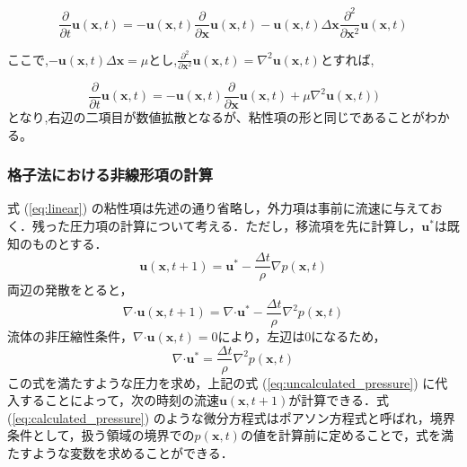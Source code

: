 \documentclass[a4j,12pt]{jreport}
\begin{document}
$$ \frac{\partial}{\partial t}\bm{u} (\bm{x},t)  =  -\bm{u} (\bm{x},t) \frac{\partial}{\partial \bm{x}}\bm{u} (\bm{x},t)  -\bm{u} (\bm{x},t) \varDelta \bm{x}\frac{\partial^2}{\partial \bm{x}^2}\bm{u} (\bm{x},t) $$

ここで,$ -\bm{u} (\bm{x},t) \varDelta \bm{x} = \mu$とし,$\frac{\partial^2}{\partial \bm{x}^2}\bm{u} (\bm{x},t)  = \nabla^2\bm{u} (\bm{x},t) $とすれば,

$$ \frac{\partial}{\partial t}\bm{u} (\bm{x},t)  =  -\bm{u} (\bm{x},t) \frac{\partial}{\partial \bm{x}}\bm{u} (\bm{x},t)  +\mu\nabla^2\bm{u} (\bm{x},t) ) $$
となり,右辺の二項目が数値拡散となるが、粘性項の形と同じであることがわかる。
\subsubsection{格子法における非線形項の計算} \label{subsec:gridpressure}
式 (\ref{eq:linear}) の粘性項は先述の通り省略し，外力項は事前に流速に与えておく．残った圧力項の計算について考える．ただし，移流項を先に計算し，$\bm{u}^*$は既知のものとする．
\begin{equation}\label{eq:uncalculated_pressure}
\bm{u} (\bm{x},t+1)  =  \bm{u}^* - \frac{\varDelta t}{\rho}\nabla p (\bm{x},t) 
\end{equation} 
両辺の発散をとると，
$$\nabla\boldsymbol{\cdot}\bm{u} (\bm{x},t+1)  =  \nabla\boldsymbol{\cdot}\bm{u}^* - \frac{\varDelta t}{\rho}\nabla^2 p (\bm{x},t) $$
流体の非圧縮性条件，$\nabla\boldsymbol{\cdot}\bm{u} (\bm{x},t)  = 0$により，左辺は0になるため，
\begin{equation}\label{eq:calculated_pressure}
\nabla\boldsymbol{\cdot}\bm{u}^* = \frac{\varDelta t}{\rho}\nabla^2 p (\bm{x},t) 
\end{equation} 
この式を満たすような圧力を求め，上記の式 (\ref{eq:uncalculated_pressure}) に代入することによって，次の時刻の流速$\bm{u} (\bm{x},t+1) $が計算できる．式 (\ref{eq:calculated_pressure}) のような微分方程式はポアソン方程式と呼ばれ，境界条件として，扱う領域の境界での$p (\bm{x},t) $の値を計算前に定めることで，式を満たすような変数を求めることができる．
\end{document}
